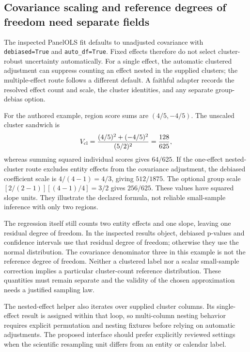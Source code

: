 \subsection{Covariance scaling and reference degrees of freedom need separate fields}
The inspected PanelOLS fit defaults to unadjusted covariance with
\texttt{debiased=True} and \texttt{auto\_df=True}. Fixed effects therefore
do not select cluster-robust uncertainty automatically. For a single effect,
the automatic clustered adjustment can suppress counting an effect nested
in the supplied clusters; the multiple-effect route follows a different
default. A faithful adapter records the resolved effect count and scale,
the cluster identities, and any separate group-debias option.
\citep{exec24_lmpanel_source}

For the authored example, region score sums are $(4/5,-4/5)$. The unscaled
cluster sandwich is
\[
 V_{\rm cl}=\frac{(4/5)^2+(-4/5)^2}{(5/2)^2}
             =\frac{128}{625},
\]
whereas summing squared individual scores gives $64/625$. If the one-effect
nested-cluster route excludes entity effects from the covariance adjustment,
the debiased coefficient scale is $4/(4-1)=4/3$, giving $512/1875$.
The optional group scale $[2/(2-1)][(4-1)/4]=3/2$ gives $256/625$.
These values have squared slope units. They illustrate the declared
formula, not reliable small-sample inference with only two regions.
\citep{exec24_lmpanel_reference}

The regression itself still counts two entity effects and one slope, leaving
one residual degree of freedom. In the inspected results object, debiased
p-values and confidence intervals use that residual degree of freedom;
otherwise they use the normal distribution. The covariance denominator
three in this example is not the reference degree of freedom. Neither a
clustered label nor a scalar small-sample correction implies a particular
cluster-count reference distribution. These quantities must remain separate
and the validity of the chosen approximation needs a justified sampling law.
\citep{exec24_lmpanel_source,exec24_lmpanel_reference}

The nested-effect helper also iterates over supplied cluster columns.
Its single-effect result is assigned within that loop, so multi-column
nesting behavior requires explicit permutation and nesting fixtures before
relying on automatic adjustments. The proposed interface should prefer
explicitly reviewed settings when the scientific resampling unit differs
from an entity or calendar label.~\citep{exec24_lmpanel_source,exec24_lmpanel_reference}

